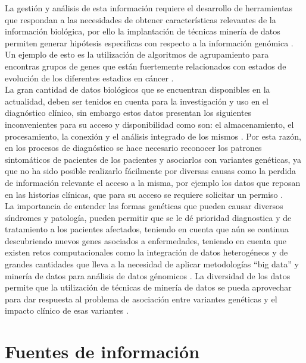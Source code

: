 La gestión y análisis de esta información requiere el desarrollo de herramientas que respondan a las necesidades de obtener características relevantes de la información biológica, por ello la implantación de técnicas minería de datos permiten generar hipótesis especificas con respecto a la información genómica \cite{Huttenhower2010}. Un ejemplo de esto es la utilización de algoritmos de agrupamiento para encontras grupos de genes que están fuertemente relacionados con estados de evolución de los diferentes estadios en cáncer \cite{Li2014}.\\

La gran cantidad de datos biológicos que se encuentran disponibles en la actualidad, deben ser tenidos en cuenta para la investigación y  uso en el diagnóstico clínico, sin embargo estos datos presentan los siguientes inconvenientes para su acceso y disponibilidad como son: el almacenamiento, el procesamiento, la conexión y el análisis integrado de los mismos \cite{Pabinger2014}. Por esta razón, en los procesos de diagnóstico se hace necesario reconocer los patrones  sintomáticos de pacientes de los pacientes y asociarlos con variantes genéticas, ya que no ha sido posible realizarlo fácilmente por diversas causas como la perdida de información relevante el acceso a la misma, por ejemplo los datos que reposan en las historias clínicas, que para su acceso se requiere solicitar un permiso \cite{Pabinger2014}. \\

La importancia de entender las formas genéticas que pueden causar diversos síndromes y patología, pueden permitir que se le dé prioridad diagnostica y de tratamiento a los pacientes afectados, teniendo en cuenta que aún se continua descubriendo nuevos genes asociados a enfermedades, teniendo en cuenta que existen retos computacionales como la integración de datos heterogéneos y de grandes cantidades que lleva a la necesidad de aplicar metodologías “big data” y minería de datos para análisis de datos génomicos \cite{Maharjan2011,Hannah-Shmouni2015,Louie2007}. La diversidad de los datos permite que la utilización de técnicas de minería de datos se pueda aprovechar para dar respuesta al problema de asociación entre variantes genéticas y el impacto clínico de esas variantes \cite{Pabinger2014}.

\section*{Fuentes de  información}

